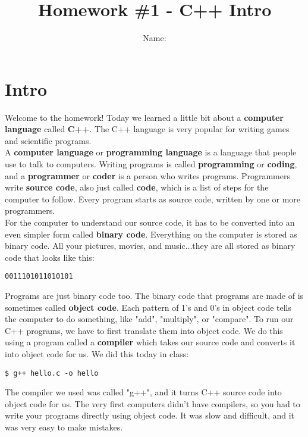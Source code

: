 \documentclass[a4paper,12pt]{article} %
\title{\textbf{Homework \#1 - C++ Intro}}
\author{Name: }
\date{} %
\begin{document}
\maketitle %

\section{Intro}

Welcome to the homework! Today we learned a little bit about a \textbf{computer language} called \textbf{C++}. The C++ language is very popular for writing games and scientific programs.\\

\noindent
A \textbf{computer language} or \textbf{programming language} is a language that people use to talk to computers. Writing programs is called \textbf{programming} or \textbf{coding}, and a \textbf{programmer} or \textbf{coder} is a person who writes programs. Programmers write \textbf{source code}, also just called \textbf{code}, which is a list of steps for the computer to follow. Every program starts as source code, written by one or more programmers.\\

\noindent
For the computer to understand our source code, it has to be converted into an even simpler form called \textbf{binary code}. Everything on the computer is stored as binary code. All your pictures, movies, and music...they are all stored as binary code that looks like this: 

\vspace{5mm}
\begin{lstlisting}
0011101011010101
\end{lstlisting}

\noindent
Programs are just binary code too. The binary code that programs are made of is sometimes called \textbf{object code}. Each pattern of 1's and 0's in object code tells the computer to do something, like "add", "multiply", or "compare". To run our C++ programs, we have to first translate them into object code. We do this using a program called a \textbf{compiler} which takes our source code and converts it into object code for us. We did this today in class:

\vspace{5mm}
\begin{lstlisting}
$ g++ hello.c -o hello
\end{lstlisting}

\noindent
The compiler we used was called "g++", and it turns C++ source code into object code for us. The very first computers didn't have compilers, so you had to write your programs directly using object code. It was slow and difficult, and it was very easy to make mistakes.\\
\end{document}
